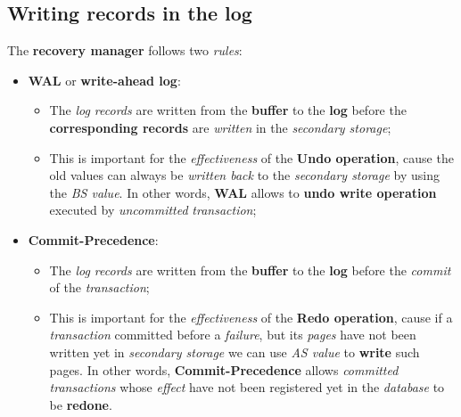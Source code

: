 \documentclass{article}
\begin{document}
\subsection {Writing records in the log}
The \textbf{recovery manager} follows two \emph{rules}:
\begin{itemize}
\item \textbf{WAL} or \textbf{write-ahead log}:
\begin{itemize}
\item The \emph{log records} are written from the \textbf{buffer} to the \textbf{log} before the \textbf{corresponding records} are \emph{written} in the \emph{secondary storage};
\item This is important for the \emph{effectiveness} of the \textbf{Undo operation}, cause the old values can always be \emph{written back} to the \emph{secondary storage} by using the \emph{BS value}. In other words, \textbf{WAL} allows to \textbf{undo write operation} executed by \emph{uncommitted} \emph{transaction};
\end{itemize}
\item \textbf{Commit-Precedence}:
\begin{itemize}
\item The \emph{log records} are written from the \textbf{buffer} to the \textbf{log} before the \emph{commit} of the \emph{transaction};
\item This is important for the \emph{effectiveness} of the \textbf{Redo operation}, cause if a \emph{transaction} committed before a \emph{failure}, but its \emph{pages} have not been written yet in \emph{secondary storage} we can use \emph{AS value} to \textbf{write} such pages. In other words, \textbf{Commit-Precedence} allows \emph{committed transactions} whose \emph{effect} have not been registered yet in the \emph{database} to be \textbf{redone}. 
\end{itemize}
\end{itemize}
\end{document}
